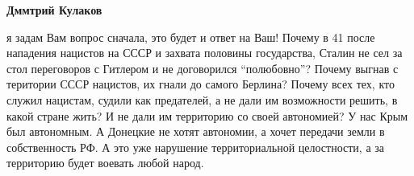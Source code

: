 \begin{itemize}
\begin{itemize}

\textbf{Дммтрий Кулаков} 

я задам Вам вопрос сначала, это будет и ответ на Ваш! Почему в 41 после
нападения нацистов на СССР и захвата половины государства, Сталин не сел за
стол переговоров с Гитлером и не договорился \enquote{полюбовно}? Почему выгнав с
територии СССР нацистов, их гнали до самого Берлина? Почему всех тех, кто
служил нацистам, судили как предателей, а не дали им возможности решить, в
какой стране жить? И не дали им территорию со своей автономией? У нас Крым был
автономным. А Донецкие не хотят автономии, а хочет передачи земли в
собственность РФ. А это уже нарушение территориальной целостности, а за
территорию будет воевать любой народ.

\end{itemize} %

\end{itemize} %
